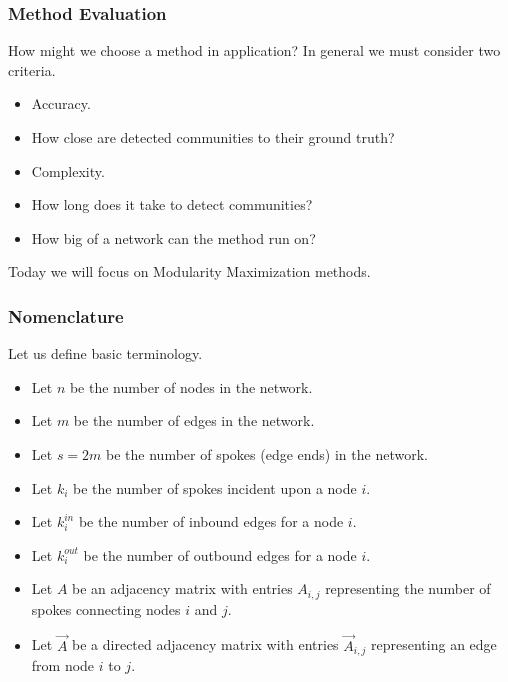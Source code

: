\documentclass{beamer}
\begin{document}
\begin{frame}

    \frametitle{Method Evaluation}

    How might we choose a method in application? In general we must consider two criteria.\pause

    \vspace{2.5mm}
    \begin{itemize}
        \item Accuracy.\pause
        \item[$\diamond$] How close are detected communities to their ground truth?\pause
        \item Complexity.\pause
        \item[$\diamond$] How long does it take to detect communities?\pause
        \item[$\ast$] How big of a network can the method run on?\pause
    \end{itemize}

    \vspace{2.5mm}
    Today we will focus on Modularity Maximization methods.

\end{frame}


\begin{frame}

    \frametitle{Nomenclature}

    Let us define basic terminology.\pause

    \vspace{5mm}
    \begin{itemize}
        \item Let $ n $ be the number of nodes in the network.\pause
        \item Let $ m $ be the number of edges in the network.\pause
        \item Let $ s = 2m $ be the number of spokes (edge ends) in the network.\pause
        \item Let $ k_{i} $ be the number of spokes incident upon a node $ i $.\pause
        \item Let $ k_{i}^{in} $ be the number of inbound edges for a node $ i $.\pause
        \item Let $ k_{i}^{out} $ be the number of outbound edges for a node $ i $.\pause
        \item Let $ A $ be an adjacency matrix with entries $ A_{i, j} $ representing the number of spokes connecting nodes $ i $ and $ j $.\pause
        \item Let $ \vec{A} $ be a directed adjacency matrix with entries $ \vec{A}_{i, j} $ representing an edge from node $ i $ to $ j $.
    \end{itemize}

\end{frame}
\end{document}

